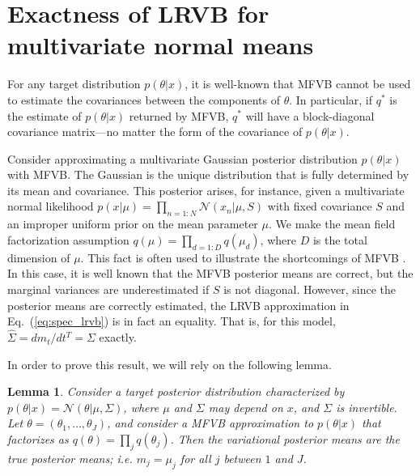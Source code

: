 \documentclass{article}\usepackage[]{graphicx}\usepackage[]{color}
\newcommand{\eq}[1]{Eq.~(\ref{eq:#1})}
\newcommand{\mpq}{m} %
\newcommand{\gauss}{\mathcal{N}} %
\newcommand{\truecov}{\Sigma} %
\newcommand{\lrcov}{\hat{\Sigma}} %
\theoremstyle{plain}
\newtheorem{lemma}[theorem]{Lemma}
\begin{document}

\section{Exactness of LRVB for multivariate normal means} \label{app:mvn_exact}

For any target distribution $p(\theta | x)$, it is well-known that MFVB cannot
be used to estimate the covariances between the components of $\theta$. In
particular, if $q^*$ is the estimate of $p(\theta | x)$ returned by MFVB, $q^*$
will have a block-diagonal covariance matrix---no matter the form of the
covariance of $p(\theta | x)$.

Consider approximating a multivariate Gaussian posterior distribution
$p(\theta|x)$ with MFVB. The Gaussian is the unique distribution that is fully
determined by its mean and covariance. This posterior arises, for instance,
given a multivariate normal likelihood $p(x | \mu) = \prod_{n=1:N} \gauss(x_n |
\mu, S)$ with fixed covariance $S$ and an improper uniform prior on the mean
parameter $\mu$. We make the mean field factorization assumption
$q(\mu)=\prod_{d=1:D} q(\mu_d)$, where $D$ is the total dimension of $\mu$. This
fact is often used to illustrate the shortcomings of MFVB
\citep{wang:2005:inadequacy,bishop:2006:pattern,turner:2011:two}.
In this case, it is well known that the MFVB posterior means are correct, but the
marginal variances are underestimated if $S$ is not diagonal.
However, since the posterior means are correctly estimated,
the LRVB approximation in \eq{spec_lrvb} is in fact an equality.
That is, for this model,
$\lrcov = d \mpq_t / d t^T = \truecov$ exactly.

In order to prove this result, we will rely on the following lemma.
%
\begin{lemma} \label{lem:lrvb_mvn}
%
  Consider a target posterior distribution characterized by $p(\theta | x) =
  \gauss(\theta | \mu, \Sigma)$, where $\mu$ and $\Sigma$ may depend on $x$, and
  $\Sigma$ is invertible. Let $\theta = (\theta_{1}, \ldots, \theta_{J})$, and
  consider a MFVB approximation to $p(\theta| x)$ that factorizes as $q(\theta) =
  \prod_{j} q(\theta_j)$. Then the variational posterior means are the true
  posterior means; i.e. $m_j = \mu_j$ for all $j$ between $1$ and $J$.
%
\end{lemma}
\end{document}
